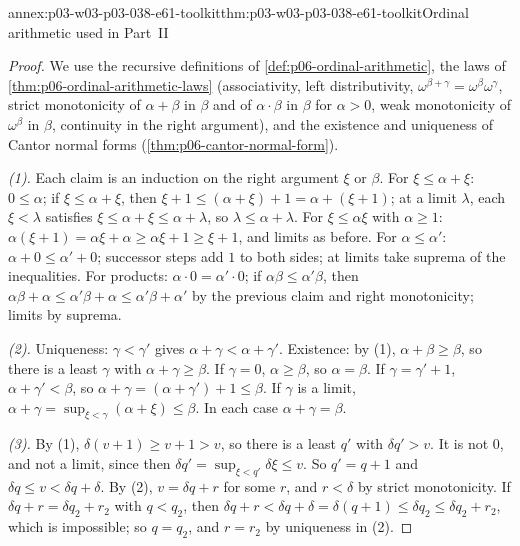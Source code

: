 \begin{annexitem}{annex:p03-w03-p03-038-e61-toolkit}{thm:p03-w03-p03-038-e61-toolkit}{Ordinal arithmetic used in Part~II}
\begin{proof}
We use the recursive definitions of \cref{def:p06-ordinal-arithmetic},
the laws of \cref{thm:p06-ordinal-arithmetic-laws} (associativity, left
distributivity, \(\omega^{\beta+\gamma}=\omega^\beta\omega^\gamma\),
strict monotonicity of \(\alpha+\beta\) in \(\beta\) and of
\(\alpha\cdot\beta\) in \(\beta\) for \(\alpha>0\), weak monotonicity of
\(\omega^\beta\) in \(\beta\), continuity in the right argument), and the
existence and uniqueness of Cantor normal forms
(\cref{thm:p06-cantor-normal-form}).

\emph{(1).} Each claim is an induction on the right argument \(\xi\) or
\(\beta\). For \(\xi\le\alpha+\xi\): \(0\le\alpha\); if
\(\xi\le\alpha+\xi\), then \(\xi+1\le(\alpha+\xi)+1=\alpha+(\xi+1)\); at a
limit \(\lambda\), each \(\xi<\lambda\) satisfies
\(\xi\le\alpha+\xi\le\alpha+\lambda\), so \(\lambda\le\alpha+\lambda\).
For \(\xi\le\alpha\xi\) with \(\alpha\ge1\): \(\alpha(\xi+1)=\alpha\xi+
\alpha\ge\alpha\xi+1\ge\xi+1\), and limits as before. For
\(\alpha\le\alpha'\): \(\alpha+0\le\alpha'+0\); successor steps add \(1\)
to both sides; at limits take suprema of the inequalities. For products:
\(\alpha\cdot0=\alpha'\cdot0\); if \(\alpha\beta\le\alpha'\beta\), then
\(\alpha\beta+\alpha\le\alpha'\beta+\alpha\le\alpha'\beta+\alpha'\) by the
previous claim and right monotonicity; limits by suprema.

\emph{(2).} Uniqueness: \(\gamma<\gamma'\) gives
\(\alpha+\gamma<\alpha+\gamma'\). Existence: by (1),
\(\alpha+\beta\ge\beta\), so there is a least \(\gamma\) with
\(\alpha+\gamma\ge\beta\). If \(\gamma=0\), \(\alpha\ge\beta\), so
\(\alpha=\beta\). If \(\gamma=\gamma'+1\), \(\alpha+\gamma'<\beta\), so
\(\alpha+\gamma=(\alpha+\gamma')+1\le\beta\). If \(\gamma\) is a limit,
\(\alpha+\gamma=\sup_{\xi<\gamma}(\alpha+\xi)\le\beta\). In each case
\(\alpha+\gamma=\beta\).

\emph{(3).} By (1), \(\delta(v+1)\ge v+1>v\), so there is a least \(q'\)
with \(\delta q'>v\). It is not \(0\), and not a limit, since then
\(\delta q'=\sup_{\xi<q'}\delta\xi\le v\). So \(q'=q+1\) and
\(\delta q\le v<\delta q+\delta\). By (2), \(v=\delta q+r\) for some
\(r\), and \(r<\delta\) by strict monotonicity. If
\(\delta q+r=\delta q_2+r_2\) with \(q<q_2\), then
\(\delta q+r<\delta q+\delta=\delta(q+1)\le\delta q_2\le\delta q_2+r_2\),
which is impossible; so \(q=q_2\), and \(r=r_2\) by uniqueness in (2).


\end{proof}
\end{annexitem}
